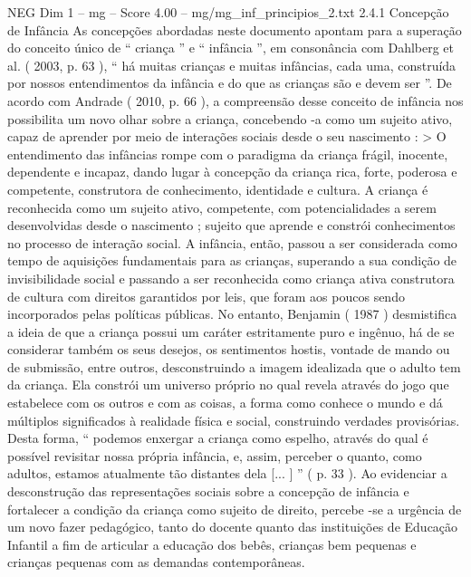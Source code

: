 \begin{textsample}{NEG Dim 1 – mg – Score 4.00 – mg/mg\_inf\_principios\_2.txt}  \label{ex:f1_neg_058}
2.4.1 Concepção de Infância As concepções abordadas neste documento apontam para a superação do conceito único de “ criança ” e “ infância ”, em consonância com Dahlberg et al. ( 2003, p. 63 ), “ há muitas crianças e muitas infâncias, cada uma, construída por nossos entendimentos da infância e do que as crianças são e devem ser ”.
De acordo com Andrade ( 2010, p. 66 ), a compreensão desse conceito de infância nos possibilita um novo olhar sobre a criança, concebendo -a como um sujeito ativo, capaz de aprender por meio de interações sociais desde o seu nascimento : > O entendimento das infâncias rompe com o paradigma da criança frágil, inocente, dependente e incapaz, dando lugar à concepção da criança rica, forte, poderosa e competente, construtora de conhecimento, identidade e cultura.
A criança é reconhecida como um sujeito ativo, competente, com potencialidades a serem desenvolvidas desde o nascimento ; sujeito que aprende e constrói conhecimentos no processo de interação social.
A infância, então, passou a ser considerada como tempo de aquisições fundamentais para as crianças, superando a sua condição de invisibilidade social e passando a ser reconhecida como criança ativa construtora de cultura com direitos garantidos por leis, que foram aos poucos sendo incorporados pelas políticas públicas.
No entanto, Benjamin ( 1987 ) desmistifica a ideia de que a criança possui um caráter estritamente puro e ingênuo, há de se considerar também os seus desejos, os sentimentos hostis, vontade de mando ou de submissão, entre outros, desconstruindo a imagem idealizada que o adulto tem da criança.
Ela constrói um universo próprio no qual revela através do jogo que estabelece com os outros e com as coisas, a forma como conhece o mundo e dá múltiplos significados à realidade física e social, construindo verdades provisórias.
Desta forma, “ podemos enxergar a criança como espelho, através do qual é possível revisitar nossa própria infância, e, assim, perceber o quanto, como adultos, estamos atualmente tão distantes dela [... ] ” ( p. 33 ).
Ao evidenciar a desconstrução das representações sociais sobre a concepção de infância e fortalecer a condição da criança como sujeito de direito, percebe -se a urgência de um novo fazer pedagógico, tanto do docente quanto das instituições de Educação Infantil a fim de articular a educação dos bebês, crianças bem pequenas e crianças pequenas com as demandas contemporâneas.

\end{textsample}
